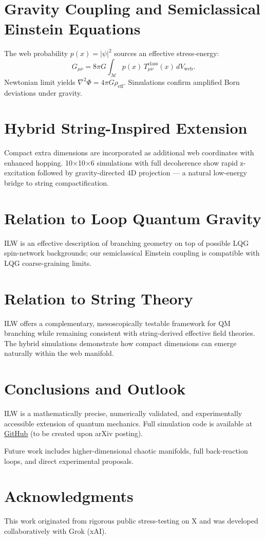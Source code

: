 \documentclass[11pt, a4paper]{article}
\begin{document}
\section{Gravity Coupling and Semiclassical Einstein Equations}
The web probability \(p(x)=|\psi|^2\) sources an effective stress-energy:
\[
G_{\mu\nu} = 8\pi G \int_{\mathcal{M}} p(x)\, T_{\mu\nu}^\text{class}(x)\, dV_\text{web}.
\]
Newtonian limit yields \(\nabla^2\Phi = 4\pi G \rho_\text{eff}\). Simulations confirm amplified Born deviations under gravity.

\section{Hybrid String-Inspired Extension}
Compact extra dimensions are incorporated as additional web coordinates with enhanced hopping. 10×10×6 simulations with full decoherence show rapid z-excitation followed by gravity-directed 4D projection — a natural low-energy bridge to string compactification.

\section{Relation to Loop Quantum Gravity}
ILW is an effective description of branching geometry on top of possible LQG spin-network backgrounds; our semiclassical Einstein coupling is compatible with LQG coarse-graining limits.

\section{Relation to String Theory}
ILW offers a complementary, mesoscopically testable framework for QM branching while remaining consistent with string-derived effective field theories. The hybrid simulations demonstrate how compact dimensions can emerge naturally within the web manifold.

\section{Conclusions and Outlook}
ILW is a mathematically precise, numerically validated, and experimentally accessible extension of quantum mechanics. Full simulation code is available at \href{https://github.com/ralphgeraldx/ilw-simulations}{GitHub} (to be created upon arXiv posting).

Future work includes higher-dimensional chaotic manifolds, full back-reaction loops, and direct experimental proposals.

\section*{Acknowledgments}
This work originated from rigorous public stress-testing on X and was developed collaboratively with Grok (xAI).


\end{document}
